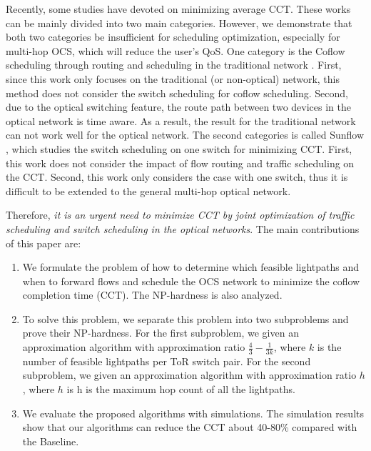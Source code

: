Recently, some studies \cite{chowdhury2012coflow} \cite{chowdhury2014efficient} \cite{dogar2014decentralized} have devoted on minimizing average CCT. These works can be mainly divided into two main categories. However, we demonstrate that both two categories be insufficient for scheduling optimization, especially for multi-hop OCS, which will reduce the user's QoS. One category is the Coflow scheduling through routing and scheduling in the traditional network \cite{zhao2015rapier}. First, since this work only focuses on the traditional (or non-optical) network, this method does not consider the switch scheduling for coflow scheduling. Second, due to the optical switching feature, the route path between two devices in the optical network is time aware. As a result, the result for the traditional network can not work well for the optical network. The second categories is called Sunflow \cite{huang2016sunflow}, which studies the switch scheduling on one switch for minimizing CCT. First, this work does not consider the impact of flow routing and traffic scheduling on the CCT. Second, this work only considers the case with one switch, thus it is difficult to be extended to the general multi-hop optical network.



Therefore, \textit{it is an urgent need to minimize CCT by joint optimization of traffic scheduling and switch scheduling in the optical networks}. The main contributions of this paper are:
\begin{enumerate}
\item We formulate the problem of how to determine which feasible lightpaths and when to forward
flows and schedule the OCS network to minimize the coflow completion time (CCT). The NP-hardness is also analyzed.
\item To solve this problem, we separate this problem into two subproblems and prove their NP-hardness. For the first subproblem, we given an approximation algorithm with approximation ratio $\frac{4}{3}-\frac{1}{3k}$, where $k$ is the number of feasible lightpaths per ToR switch pair. For the second subproblem,  we given an approximation algorithm with approximation ratio $h$, where $h$ is  h is the maximum hop count of all the lightpaths.

\item We evaluate the proposed algorithms with simulations. The simulation results show that our algorithms can reduce the CCT about 40-80\% compared with the Baseline. %
\end{enumerate}



